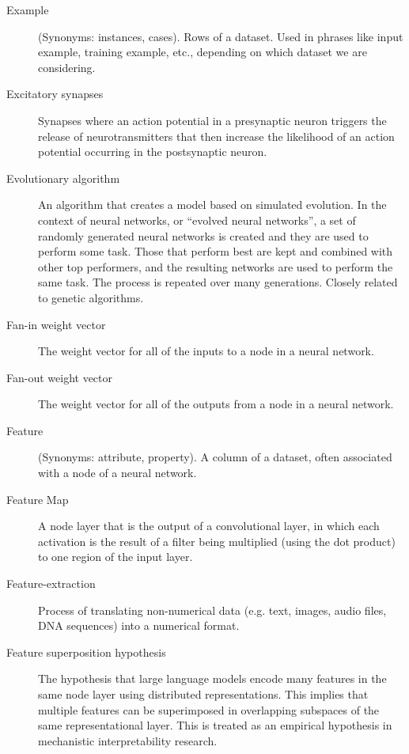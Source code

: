 \begin{description}
\item[Example] (Synonyms: instances, cases). Rows of a dataset. Used in phrases like input example, training example, etc., depending on which dataset we are considering.

\item[Excitatory synapses] Synapses where an action potential in a presynaptic neuron triggers the release of neurotransmitters that then increase the likelihood of an action potential occurring in the postsynaptic neuron.

\item[Evolutionary algorithm] An algorithm that creates a model based on simulated evolution. In the context of neural networks, or ``evolved neural networks'', a set of randomly generated neural networks is created and they are used to perform some task.  Those that perform best are kept and combined with other top performers, and the resulting networks are used to perform the same task. The process is repeated over many generations. Closely related to genetic algorithms.

\item[Fan-in weight vector] The weight vector for all of the inputs to a node in a neural network.

\item[Fan-out weight vector] The weight vector for all of the outputs from a node in a neural network.

\item[Feature] (Synonyms: attribute, property). A column of a dataset, often associated with a node of a neural network.

\item[Feature Map] A node layer that is the output of a convolutional layer, in which each activation is the result of a filter being multiplied (using the dot product) to one region of the input layer.

\item[Feature-extraction]  Process of translating non-numerical data (e.g. text, images, audio files, DNA sequences) into a numerical format. %

\item[Feature superposition hypothesis] The hypothesis that large language models encode many features in the same node layer using distributed representations. This implies that multiple features can be superimposed in overlapping subspaces of the same representational layer. This is treated as an empirical hypothesis in mechanistic interpretability research.


\end{description}
